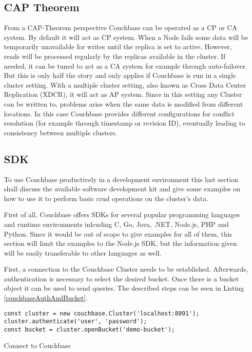 \subsection{CAP Theorem}
From a CAP-Theorem perspective Couchbase can be operated as a CP or CA system. By default it will act as CP system. When a Node fails some data will be temporarily unavailable for writes until the replica is set to active. However, reads will be processed regularly by the replicas available in the cluster. If needed, it can be tuned to act as a CA system for example through auto-failover. But this is only half the story and only applies if Couchbase is run in a single cluster setting. With a multiple cluster setting, also known as Cross Data Center Replication (XDCR), it will act as AP system. Since in this setting any Cluster can be written to, problems arise when the same data is modified from different locations. In this case Couchbase provides different configurations for conflict resolution (for example through timestamp or revision ID), eventually leading to consistency between multiple clusters. \parencite{couchbaseCAP}

\subsection{SDK}
\label{couchbase:section:SDK}
To use Couchbase productively in a development environment this last section shall discuss the available software development kit and give some examples on how to use it to perform basic \gls{crud} operations on the cluster's data.

First of all, Couchbase offers SDKs for several popular programming languages and runtime environments inlcuding C, Go, Java, .NET, Node.js, PHP and Python. \parencite{couchbaseSDK} Since it would be out of scope to give examples for all of them, this section will limit the examples to the Node.js SDK, but the information given will be easily transferable to other languages as well.

First, a connection to the Couchbase Cluster needs to be established. Afterwards, authentication is necessary to select the desired bucket. Once there is a bucket object it can be used to send queries. The described steps can be seen in Listing \ref{couchbaseAuthAndBucket}.

\begin{listing}[ht]
\begin{verbatim}
const cluster = new couchbase.Cluster('localhost:8091');
cluster.authenticate('user', 'password');
const bucket = cluster.openBucket('demo-bucket');
\end{verbatim}
\caption{Connect to Couchbase}
\label{couchbaseAuthAndBucket}
\end{listing}

